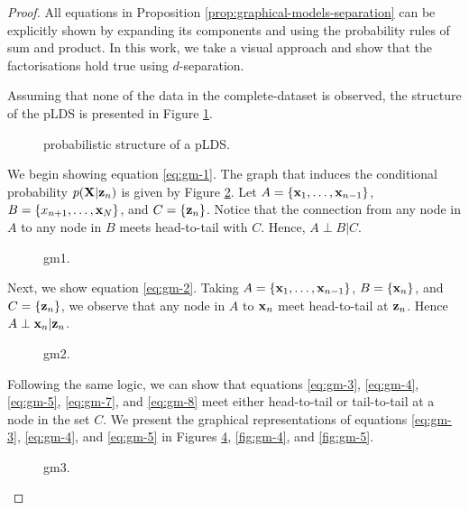 \documentclass[11pt]{article}
\numberwithin{equation}{section}
\newcommand{\x}{{\bf x}}
\newcommand{\X}{{\bf X}}
\newcommand{\z}{{\bf z}}
\begin{document}
\begin{proof}
	All equations in Proposition \ref{prop:graphical-models-separation} can be explicitly shown by expanding its components and using the probability rules of sum and product. In this work, we take a visual approach and show that the factorisations hold true using $d$-separation.
	
	Assuming that none of the data in the complete-dataset is observed, the structure of the pLDS is presented in Figure \ref{fig:lds-skeleton}.
	
	\begin{figure}[h!]
		\centering
		\resizebox{\columnwidth}{!}{}
		\caption{probabilistic structure of a pLDS.}
		\label{fig:lds-skeleton}
	\end{figure}

	We begin showing equation \eqref{eq:gm-1}. The graph that induces the conditional probability $p(\X \vert \z_n)$ is given by Figure \ref{fig:gm-1}. Let $A = \{\x_1, \ldots, \x_{n-1}\}$, $B = \{x_{n+1}, \ldots, \x_N\}$, and $C = \{\z_n\}$. Notice that the connection from any node in $A$ to any node in $B$ meets head-to-tail with $C$. Hence, $A \perp B \vert C$.
	
	\begin{figure}[h!]
		\centering
		\resizebox{\columnwidth}{!}{}
		\caption{gm1.}
		\label{fig:gm-1}
	\end{figure}
	
	Next, we show equation \eqref{eq:gm-2}. Taking $A = \{\x_1, \ldots, \x_{n-1}\}$, $B = \{\x_n\}$, and $C = \{\z_n\}$, we observe that any node in $A$ to $\x_n$ meet head-to-tail at $\z_n$. Hence $A \perp \x_n \vert \z_n$.
	\begin{figure}[h!]
		\centering
		\resizebox{\columnwidth}{!}{}
		\caption{gm2.}
		\label{fig:gm-2}
	\end{figure}

	Following the same logic, we can show that equations \eqref{eq:gm-3}, \eqref{eq:gm-4}, \eqref{eq:gm-5}, \eqref{eq:gm-7}, and \eqref{eq:gm-8}  meet either head-to-tail or tail-to-tail at a node in the set $C$. We present the graphical representations of equations \eqref{eq:gm-3}, \eqref{eq:gm-4}, and \eqref{eq:gm-5} in Figures \ref{fig:gm-3}, \ref{fig:gm-4}, and \ref{fig:gm-5}.
	\begin{figure}[h!]
		\centering
		\resizebox{\columnwidth}{!}{}
		\caption{gm3.}
		\label{fig:gm-3}
	\end{figure}
	

\end{proof}
\end{document}

